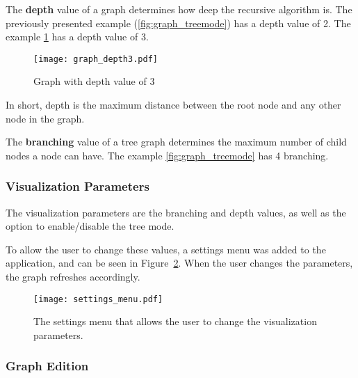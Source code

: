       The \textbf{depth} value of a graph determines how deep the recursive algorithm is.
      The previously presented example (\ref{fig:graph_treemode}) has a depth value of 2.
      The example \ref{fig:graph_depth3} has a depth value of 3.
      \begin{figure}[tb]
        \begin{center}
          \texttt{[image: graph\_depth3.pdf]}
        \end{center}
        \caption{Graph with depth value of 3}
        \label{fig:graph_depth3}
      \end{figure}
      In short, depth is the maximum distance between the root node and any other node in the graph.

      The \textbf{branching} value of a tree graph determines the maximum number of child nodes a node can have.
      The example \ref{fig:graph_treemode} has 4 branching.


    \subsubsection{Visualization Parameters} %
    \label{ssub:visualization_parameters}
    
    The visualization parameters are the branching and depth values, as well as the option to enable/disable the tree mode.

    To allow the user to change these values, a settings menu was added to the application, and can be seen in Figure~\ref{fig:settings_menu}.
    When the user changes the parameters, the graph refreshes accordingly.

    \begin{figure}[tb]
      \begin{center}
        \texttt{[image: settings\_menu.pdf]}
      \end{center}
      \caption{The settings menu that allows the user to change the visualization parameters.}
      \label{fig:settings_menu} 
    \end{figure}


    \subsubsection{Graph Edition} %
      \label{ssub:edition}

